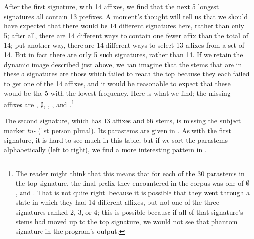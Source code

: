\documentclass[output=paper,colorlinks,citecolor=brown]{langscibook}
\begin{document}
 
 
After the first signature, with 14 affixes, we find that the next 5 longest signatures all contain 13 prefixes. A moment's thought will tell us that we should have expected that there would be 14 different signatures here, rather than only 5; after all, there are 14 different ways to contain one fewer affix than the total of 14; put another way, there are 14 different ways to select 13 affixes from a set of 14. But in fact there are only 5 such signatures, rather than 14. If we retain the dynamic image described just above, we can imagine that the stems that are in these 5 signatures are those which failed to reach the top because they each failed to get one of the 14 affixes, and it would be reasonable to expect that these would be the 5 with the lowest frequency. Here is what we find; the missing affixes are \textit{}, $\emptyset$, \textit{}, \textit{}, and \textit{}.\footnote{The reader might think that this means that for each of the 30 parastems in the top signature, the final prefix they encountered in the corpus was one of $\emptyset$, \textit{} and \textit{}. That is not quite right, because it is possible that they went through a state in which they had 14 different affixes, but not one of the three signatures ranked 2, 3, or 4; this is possible because if all of that signature's stems had moved up to the top signature, we would not see that phantom signature in the program's output.}  
  
The second signature, which has 13 affixes and 56 stems, is missing the subject marker \textit{tu-} (1st person plural). Its parastems are given in . As with the first signature, it is hard to see much in this table, but if we sort the parastems alphabetically (left to right), we find a more interesting pattern in .
\end{document}
